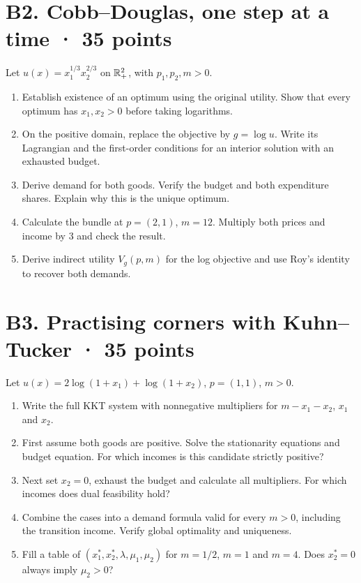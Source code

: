 \section*{B2. Cobb--Douglas, one step at a time · 35 points}
Let $u(x)=x_1^{1/3}x_2^{2/3}$ on $\mathbb R_+^2$, with $p_1,p_2,m>0$.
\begin{enumerate}[label=(\alph*)]
\item Establish existence of an optimum using the original utility. Show that every optimum has $x_1,x_2>0$ before taking logarithms.
\item On the positive domain, replace the objective by $g=\log u$. Write its Lagrangian and the first-order conditions for an interior solution with an exhausted budget.
\item Derive demand for both goods. Verify the budget and both expenditure shares. Explain why this is the unique optimum.
\item Calculate the bundle at $p=(2,1)$, $m=12$. Multiply both prices and income by 3 and check the result.
\item Derive indirect utility $V_g(p,m)$ for the log objective and use Roy's identity to recover both demands.
\end{enumerate}

\section*{B3. Practising corners with Kuhn--Tucker · 35 points}
Let $u(x)=2\log(1+x_1)+\log(1+x_2)$, $p=(1,1)$, $m>0$.
\begin{enumerate}[label=(\alph*)]
\item Write the full KKT system with nonnegative multipliers for $m-x_1-x_2$, $x_1$ and $x_2$.
\item First assume both goods are positive. Solve the stationarity equations and budget equation. For which incomes is this candidate strictly positive?
\item Next set $x_2=0$, exhaust the budget and calculate all multipliers. For which incomes does dual feasibility hold?
\item Combine the cases into a demand formula valid for every $m>0$, including the transition income. Verify global optimality and uniqueness.
\item Fill a table of $(x_1^*,x_2^*,\lambda,\mu_1,\mu_2)$ for $m=1/2$, $m=1$ and $m=4$. Does $x_2^*=0$ always imply $\mu_2>0$?
\end{enumerate}
